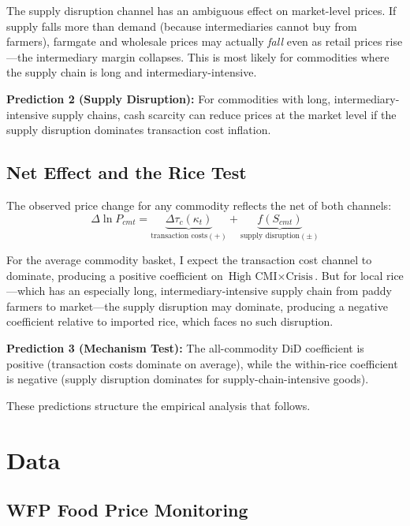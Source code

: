 \documentclass[12pt]{article}
\begin{document}
The supply disruption channel has an ambiguous effect on market-level prices. If supply falls more than demand (because intermediaries cannot buy from farmers), farmgate and wholesale prices may actually \emph{fall} even as retail prices rise---the intermediary margin collapses. This is most likely for commodities where the supply chain is long and intermediary-intensive.

\textbf{Prediction 2 (Supply Disruption):} For commodities with long, intermediary-intensive supply chains, cash scarcity can reduce prices at the market level if the supply disruption dominates transaction cost inflation.

\subsection{Net Effect and the Rice Test}

The observed price change for any commodity reflects the net of both channels:
\begin{equation}
\Delta \ln P_{cmt} = \underbrace{\Delta \tau_c(\kappa_t)}_{\text{transaction costs}(+)} + \underbrace{f(S_{cmt})}_{\text{supply disruption}(\pm)}
\label{eq:net}
\end{equation}

For the average commodity basket, I expect the transaction cost channel to dominate, producing a positive coefficient on $\text{High CMI} \times \text{Crisis}$. But for local rice---which has an especially long, intermediary-intensive supply chain from paddy farmers to market---the supply disruption may dominate, producing a negative coefficient relative to imported rice, which faces no such disruption.

\textbf{Prediction 3 (Mechanism Test):} The all-commodity DiD coefficient is positive (transaction costs dominate on average), while the within-rice coefficient is negative (supply disruption dominates for supply-chain-intensive goods).

These predictions structure the empirical analysis that follows.


\section{Data}
\label{sec:data}

\subsection{WFP Food Price Monitoring}
\end{document}
